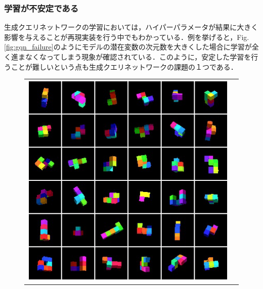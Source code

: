\subsubsection{学習が不安定である}
生成クエリネットワークの学習においては，ハイパーパラメータが結果に大きく影響を与えることが再現実装を行う中でもわかっている．例を挙げると，Fig. \ref{fig:gqn_failure}のようにモデルの潜在変数の次元数を大きくした場合に学習が全く進まなくなってしまう現象が確認されている．このように，安定した学習を行うことが難しいという点も生成クエリネットワークの課題の１つである．

\begin{figure}[tbp]
  \begin{center}
    \begin{tabular}{cc}
      \begin{minipage}{0.5\linewidth}
        \begin{center}
          \includegraphics[width=\linewidth]{./figures/gqn_failure_gt.png}
        \end{center}
      \end{minipage}
      &
      \begin{minipage}{0.5\linewidth}
        \begin{center}

\end{center}
\end{minipage}
\end{tabular}
\end{center}
\end{figure}
